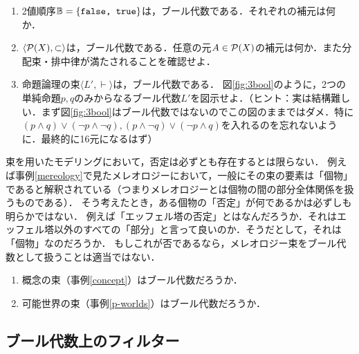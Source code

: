 \documentclass[11pt,a4paper]{jsarticle}
\begin{document}
\begin{exercise}
 \begin{enumerate}
    \item 2値順序$\mathbb{B} = \{ \texttt{false, true} \}$は，ブール代数である．それぞれの補元は何か．
    \item $\langle \mathcal{P}(X), \subset \rangle$は，ブール代数である．任意の元$A \in \mathcal{P}(X)$の補元は何か．また分配束・排中律が満たされることを確認せよ．
    \item 命題論理の束$\langle L', \vdash \rangle$は，ブール代数である．
    図\ref{fig:3bool}のように，2つの単純命題$p, q$のみからなるブール代数$L'$を図示せよ．（ヒント：実は結構難しい．まず図\ref{fig:3bool}はブール代数ではないのでこの図のままではダメ．特に$(p \wedge q)\vee(\neg p \wedge \neg q), (p \wedge \neg q)\vee(\neg p \wedge q)$を入れるのを忘れないように．最終的に16元になるはず）%
 \end{enumerate}
\end{exercise}

束を用いたモデリングにおいて，否定は必ずとも存在するとは限らない．
例えば事例\ref{mereology}で見たメレオロジーにおいて，一般にその束の要素は「個物」であると解釈されている（つまりメレオロジーとは個物の間の部分全体関係を扱うものである）．
そう考えたとき，ある個物の「否定」が何であるかは必ずしも明らかではない．
例えば「エッフェル塔の否定」とはなんだろうか．それはエッフェル塔以外のすべての「部分」と言って良いのか．そうだとして，それは「個物」なのだろうか．
もしこれが否であるなら，メレオロジー束をブール代数として扱うことは適当ではない．

\begin{exercise}
    \begin{enumerate}
        \item 概念の束（事例\ref{concept}）はブール代数だろうか．
        \item 可能世界の束（事例\ref{p-worlds}）はブール代数だろうか．
    \end{enumerate}
\end{exercise}



\subsection{ブール代数上のフィルター}
\end{document}
